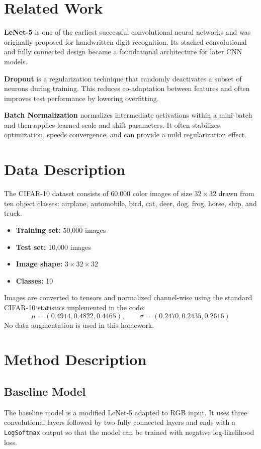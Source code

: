 \documentclass[11pt]{article}
\begin{document}
\section{Related Work}
\textbf{LeNet-5} \cite{lecun1998gradient} is one of the earliest successful convolutional
neural networks and was originally proposed for handwritten digit recognition. Its
stacked convolutional and fully connected design became a foundational architecture for
later CNN models.

\textbf{Dropout} \cite{srivastava2014dropout} is a regularization technique that randomly
deactivates a subset of neurons during training. This reduces co-adaptation between
features and often improves test performance by lowering overfitting.

\textbf{Batch Normalization} \cite{ioffe2015batch} normalizes intermediate activations
within a mini-batch and then applies learned scale and shift parameters. It often
stabilizes optimization, speeds convergence, and can provide a mild regularization
effect.

\section{Data Description}
The CIFAR-10 dataset consists of 60{,}000 color images of size $32 \times 32$ drawn
from ten object classes: airplane, automobile, bird, cat, deer, dog, frog, horse,
ship, and truck.

\begin{itemize}
  \item \textbf{Training set:} 50,000 images
  \item \textbf{Test set:} 10,000 images
  \item \textbf{Image shape:} $3 \times 32 \times 32$
  \item \textbf{Classes:} 10
\end{itemize}

Images are converted to tensors and normalized channel-wise using the standard
CIFAR-10 statistics implemented in the code:
\[
  \mu = (0.4914, 0.4822, 0.4465), \qquad
  \sigma = (0.2470, 0.2435, 0.2616)
\]
No data augmentation is used in this homework.

\section{Method Description}

\subsection{Baseline Model}
The baseline model is a modified LeNet-5 adapted to RGB input. It uses three
convolutional layers followed by two fully connected layers and ends with a
\texttt{LogSoftmax} output so that the model can be trained with negative log-likelihood
loss.
\end{document}
